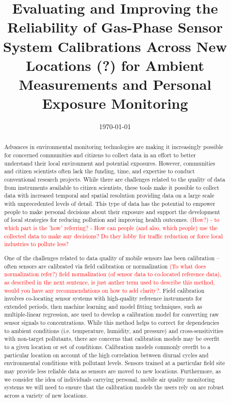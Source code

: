 \documentclass[journal abbreviation, manuscript]{copernicus}
\title{Evaluating and Improving the Reliability of Gas-Phase Sensor System Calibrations Across New Locations (?) for Ambient Measurements and Personal Exposure Monitoring}
\date{\today}
\affil[]{University of California, San Diego}
\affil[]{ADDRESS}
\newcommand\todo[1]{\textcolor{red}{#1}}
\begin{document}
\maketitle

\begin{abstract}

Advances in environmental monitoring technologies are making it increasingly possible for concerned communities and citizens to collect data in an effort to better understand their local environment and potential exposures. However, communities and citizen scientists often lack the funding, time, and expertise to conduct conventional research projects. While there are challenges related to the quality of data from instruments available to citizen scientists, these tools make it possible to collect data with increased temporal and spatial resolution providing data on a large scale with unprecedented levels of detail. This type of data has the potential to empower people to make personal decisions about their exposure and support the development of local strategies for reducing pollution and improving health outcomes. \todo{(How?) - to which part is the 'how' referring? - How can people (and also, which people) use the collected data to make any decisions? Do they lobby for traffic reduction or force local industries to pollute less?} 

One of the challenges related to data quality of mobile sensors has been calibration – often sensors are calibrated via field calibration or normalization \todo{(To what does normalization refer?) field normalization (of sensor data to co-located reference data), as described in the next sentence, is just anther term used to describe this method, would you have any recommendations on how to add clarity?}. Field calibration involves co-locating sensor systems with high-quality reference instruments for extended periods, then machine learning and model fitting techniques, such as multiple-linear regression, are used to develop a calibration model for converting raw sensor signals to concentrations. While this method helps to correct for dependencies to ambient conditions (i.e. temperature, humidity, and pressure) and cross-sensitivities with non-target pollutants, there are concerns that calibration models may be overfit to a given location or set of conditions. Calibration models commonly overfit to a particular location on account of the high correlation between diurnal cycles and environmental conditions with pollutant levels. Sensors trained at a particular field site may provide less reliable data as sensors are moved to new locations. Furthermore, as we consider the idea of individuals carrying personal, mobile air quality monitoring systems we will need to ensure that the calibration models the users rely on are robust across a variety of new locations.


\end{abstract}
\end{document}
